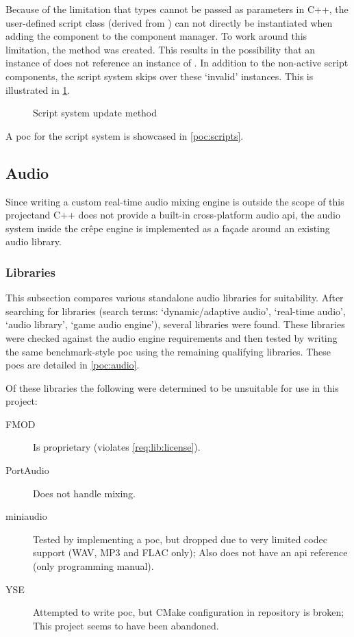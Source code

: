 \documentclass{projdoc}
\begin{document}
Because of the limitation that types cannot be passed as parameters in C++, the
user-defined script class (derived from ) can not directly be
instantiated when adding the component to the component manager. To work around this
limitation, the method  was created. This
results in the possibility that an instance of  does not
reference an instance of . In addition to the non-active script
components, the script system skips over these `invalid' instances. This is
illustrated in \cref{fig:activity-scripts}.

\begin{figure}
	\centering
	\caption{Script system update method}
	\label{fig:activity-scripts}
\end{figure}

A \gls{poc} for the script system is showcased in \cref{poc:scripts}.

\subsection{Audio}

Since writing a custom real-time audio mixing engine is outside the scope of this
project\mref and C++ does not provide a built-in cross-platform audio \gls{api}, the
audio system inside the cr\^epe engine is implemented as a fa\c{c}ade around an
existing audio library.

\subsubsection{Libraries}
\label{sec:audio:libs}

This subsection compares various standalone audio libraries for suitability. After
searching for libraries (search terms: `dynamic/adaptive audio', `real-time audio',
`audio library', `game audio engine'), several libraries were found. These libraries
were checked against the audio engine requirements \autocite{crepe:requirements} and
then tested by writing the same benchmark-style \gls{poc} using the remaining
qualifying libraries. These \glspl{poc} are detailed in \cref{poc:audio}.

Of these libraries the following were determined to be unsuitable for use in this
project:\noparbreak
\begin{description}
	\item[FMOD \autocite{lib:fmod}] Is proprietary (violates \cref{req:lib:license}).
	\item[PortAudio \autocite{lib:portaudio}] Does not handle mixing.
	\item[miniaudio \autocite{lib:miniaudio}] Tested by implementing a \gls{poc}, but
		dropped due to very limited codec support (WAV, MP3 and FLAC only); Also does not
		have an \gls{api} reference (only programming manual).
	\item[YSE \autocite{lib:yse}] Attempted to write \gls{poc}, but CMake configuration
		in repository is broken; This project seems to have been abandoned.
\end{description}
\end{document}
